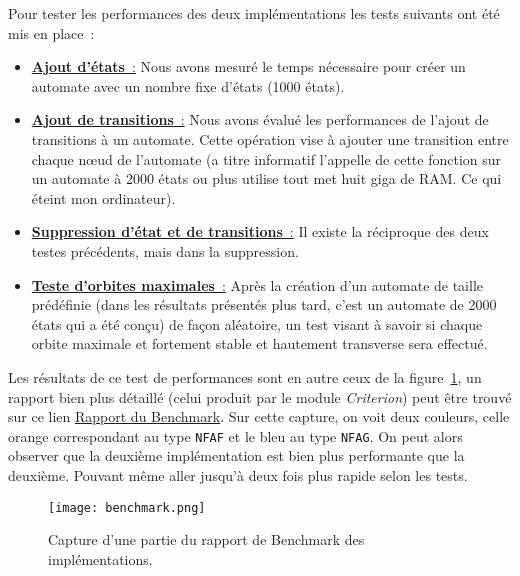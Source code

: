 \vphantom{}

Pour tester les performances des deux implémentations les tests suivants ont été
mis en place~:

\begin{itemize}
    \item[\textbullet] \underline{\textbf{Ajout d'états}~:} Nous avons mesuré le
        temps nécessaire pour créer un automate avec un nombre fixe d'états
        (1000 états).
    \item[\textbullet] \underline{\textbf{Ajout de transitions}~:} Nous avons
        évalué les performances de l'ajout de transitions à un automate.
        Cette opération vise à ajouter une transition entre chaque n\oe ud de
        l'automate (a titre informatif l'appelle de cette fonction sur un automate à
        2000 états ou plus utilise tout met huit giga de RAM. Ce qui éteint mon
        ordinateur).
    \item[\textbullet] \underline{\textbf{Suppression d'état et de transitions}~:}
        Il existe la réciproque des deux testes précédents, mais dans la suppression.
    \item[\textbullet] \underline{\textbf{Teste d'orbites maximales}~:} Après la
        création d'un automate de taille prédéfinie (dans les résultats présentés plus
        tard, c'est un automate de 2000 états qui a été conçu) de façon aléatoire, un
        test visant à savoir si chaque orbite maximale et fortement stable et hautement
        transverse sera effectué.
\end{itemize}

\vphantom{}

Les résultats de ce test de performances sont en autre ceux de la
figure~\ref{fig:imgBench}, un rapport bien plus détaillé (celui produit par le
module \textit{Criterion}) peut être trouvé sur ce lien
\href{run:./report_perf.html}{Rapport du Benchmark}. Sur cette capture, on voit
deux couleurs, celle orange correspondant au type \texttt{NFAF} et
le bleu au type \texttt{NFAG}. On peut alors observer que la
deuxième implémentation est bien plus performante que la deuxième. Pouvant même
aller jusqu'à deux fois plus rapide selon les tests.

\begin{figure}[H]
    \texttt{[image: benchmark.png]}
    \caption{
        Capture d'une partie du rapport de Benchmark des implémentations.
    }\label{fig:imgBench}
\end{figure}

